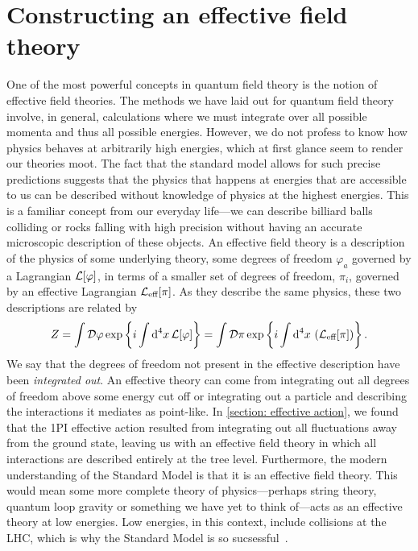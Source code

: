 \section{Constructing an effective field theory}
\label{section: effective field theories}

One of the most powerful concepts in quantum field theory is the notion of effective field theories.
The methods we have laid out for quantum field theory involve, in general, calculations where we must integrate over all possible momenta and thus all possible energies.
However, we do not profess to know how physics behaves at arbitrarily high energies, which at first glance seem to render our theories moot.
The fact that the standard model allows for such precise predictions suggests that the physics that happens at energies that are accessible to us can be described without knowledge of physics at the highest energies.
This is a familiar concept from our everyday life---we can describe billiard balls colliding or rocks falling with high precision without having an accurate microscopic description of these objects.
An effective field theory is a description of the physics of some underlying theory, some degrees of freedom $\varphi_a$ governed by a Lagrangian $\mathcal{L}[\varphi]$, in terms of a smaller set of degrees of freedom, $\pi_i$, governed by an effective Lagrangian $\mathcal{L}_\text{eff}[\pi]$.
As they describe the same physics, these two descriptions are related by 
%
\begin{equation}
    Z = \int \mathcal D \varphi \, \text{exp} \left\{ i\int \text{d}^4 x \, \mathcal{L}[\varphi] \right\}
    = \int \mathcal D \pi\, \text{exp} \left\{ i\int \text{d}^4 x \, \left( \mathcal{L}_\text{eff}[\pi]\right) \right\}.
\end{equation}
%
We say that the degrees of freedom not present in the effective description have been \emph{integrated out}.
An effective theory can come from integrating out all degrees of freedom above some energy cut off or integrating out a particle and describing the interactions it mediates as point-like.
In \autoref{section: effective action}, we found that the 1PI effective action resulted from integrating out all fluctuations away from the ground state, leaving us with an effective field theory in which all interactions are described entirely at the tree level.
Furthermore, the modern understanding of the Standard Model is that it is an effective field theory.
This would mean some more complete theory of physics---perhaps string theory, quantum loop gravity or something we have yet to think of---acts as an effective theory at low energies.
Low energies, in this context, include collisions at the LHC, which is why the Standard Model is so sucsessful~\autocite{pencoIntroductionEffectiveField2020}.

